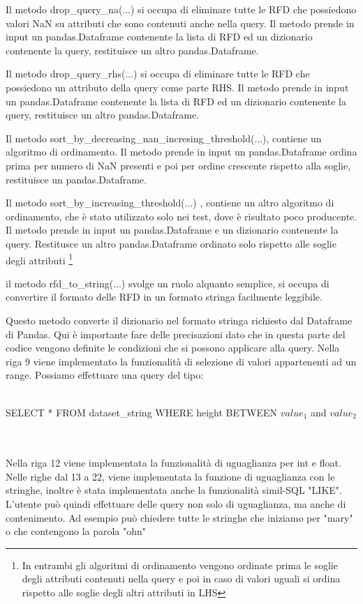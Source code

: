 Il metodo drop{\_}query{\_}na(...) si occupa di eliminare tutte le RFD che possiedono valori NaN su attributi che sono contenuti anche nella query. Il metodo prende in input un pandas.Dataframe contenente la lista di RFD ed un dizionario contenente la query, restituisce un altro pandas.Dataframe.

Il metodo drop{\_}query{\_}rhs(...) si occupa di eliminare tutte le RFD che possiedono un attributo della query come parte RHS. Il metodo prende in input un pandas.Dataframe contenente la lista di RFD ed un dizionario contenente la query, restituisce un altro pandas.Dataframe.

Il metodo sort{\_}by{\_}decreasing{\_}nan{\_}incresing{\_}threshold(...), contiene un algoritmo di ordinamento. Il metodo prende in input un pandas.Dataframe ordina prima per numero di NaN presenti e poi per ordine crescente rispetto alla soglie, restituisce un pandas.Dataframe.

Il metodo sort{\_}by{\_}increasing{\_}threshold(...) , contiene un altro algoritmo di ordinamento, che è stato utilizzato solo nei test, dove è risultato poco producente. Il metodo prende in input un pandas.Dataframe e un dizionario contenente la query. Restitusce un altro pandas.Dataframe ordinato solo rispetto alle soglie degli attributi \footnote{In entrambi gli algoritmi di ordinamento vengono ordinate prima le soglie degli attributi contenuti nella query e poi in caso di valori uguali si ordina rispetto alle soglie degli altri attributi in LHS}

il metodo rfd{\_}to{\_}string(...) svolge un ruolo alquanto semplice, si occupa di convertire il formato delle RFD in un formato stringa facilmente leggibile.

Questo metodo converte il dizionario nel formato stringa richiesto dal Dataframe di Pandas.
Qui è importante fare delle precisazioni dato che in  questa parte del codice vengono definite le condizioni che si possono applicare alla query.
Nella riga 9 viene implementato la funzionalità di selezione di valori appartenenti ad un range. Possiamo effettuare una query del tipo:
\\~\\
\centerline{SELECT * FROM dataset{\_}string WHERE height BETWEEN $value_1$ and $value_2$}
\\~\\
Nella riga 12 viene implementata la funzionalità di uguaglianza per int e float.
Nelle righe dal 13 a 22, viene implementata la funzione di uguaglianza con le stringhe, inoltre è stata implementata anche la funzionalità simil-SQL "LIKE". L'utente può quindi effettuare delle query non solo di uguaglianza, ma anche di contenimento. Ad esempio può chiedere tutte le stringhe che iniziamo per "mary" o che contengono la parola "ohn"

